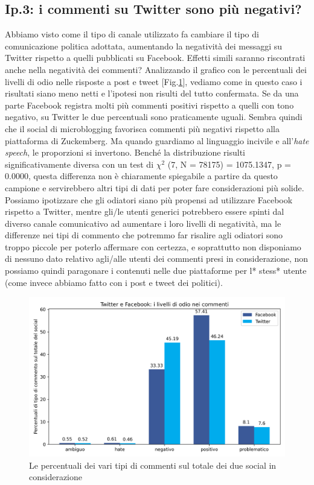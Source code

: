 \subsection{Ip.3: i commenti su Twitter sono più negativi?}
Abbiamo visto come il tipo di canale  utilizzato fa cambiare il tipo di comunicazione politica adottata, aumentando la negatività dei messaggi su Twitter rispetto a quelli pubblicati su Facebook. Effetti simili saranno riscontrati anche nella negatività dei commenti?
Analizzando il grafico con le percentuali dei livelli di odio nelle risposte a post e tweet [Fig.\ref{fig:hatefb}], vediamo come in questo caso i risultati siano meno netti e l'ipotesi non risulti del tutto confermata. Se da una parte Facebook registra molti più commenti positivi rispetto a quelli con tono negativo, su Twitter le due percentuali sono praticamente uguali. Sembra quindi che il social di microblogging favorisca commenti più negativi rispetto alla piattaforma di Zuckemberg. Ma quando guardiamo al linguaggio incivile e all’\textit{hate speech}, le proporzioni si invertono. Benché la distribuzione risulti significativamente diversa con un test di $\chi^{2}$ (7, N = 78175) = 1075.1347, p = 0.0000, questa differenza non è chiaramente spiegabile a partire da questo campione e servirebbero altri tipi di dati per poter fare considerazioni più solide. Possiamo ipotizzare che gli odiatori siano più propensi ad utilizzare Facebook rispetto a Twitter, mentre gli/le utenti generici potrebbero essere spinti dal diverso canale comunicativo ad aumentare i loro livelli di negatività, ma le differenze nei tipi di commento che potremmo far risalire agli odiatori sono troppo piccole per poterlo affermare con certezza, e soprattutto non disponiamo di nessuno dato relativo agli/alle utenti dei commenti presi in considerazione, non possiamo quindi paragonare i contenuti nelle due piattaforme per l* stess* utente (come invece abbiamo fatto con i post e tweet dei politici).
\begin{figure}
	\includegraphics[width=\textwidth]{figures/hatefb}
	\caption{Le percentuali dei vari tipi di commenti sul totale dei due social in considerazione }
	\label{fig:hatefb}
\end{figure}


